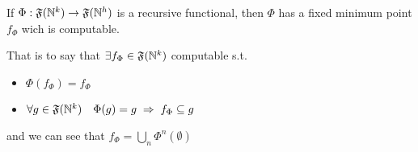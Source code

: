 \begin{theorem}
  If $\Phi : \mathfrak{F}(\mathbb{N}^k) \rightarrow \mathfrak{F}(\mathbb{N}^h)$ is
  a recursive functional, then $\Phi$ has a fixed minimum point
  $f_\Phi$ wich is computable.
\end{theorem}

That is to say that $\exists f_\Phi \in \mathfrak{F}(\mathbb{N}^k)$
computable s.t.
\begin{itemize}
\item $\Phi(f_\Phi) = f_\Phi$
\item
  $\forall g \in \mathfrak{F}(\mathbb{N}^k) \quad \Phi(g) = g \; \Rightarrow
  \; f_\Phi \subseteq g$
\end{itemize}
and we can see that $f_\Phi = \bigcup\limits_n \Phi^{n}(\emptyset)$
